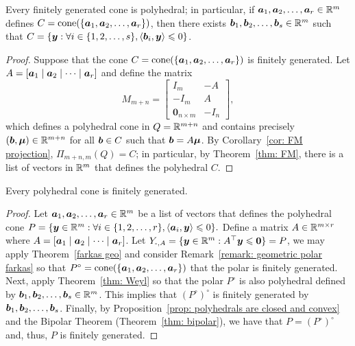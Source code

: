\begin{theorem}\label{thm: Weyl}
Every finitely generated cone is polyhedral; in particular, if ${\boldsymbol a}_1, {\boldsymbol a}_2, \dots, {\boldsymbol a}_r\in\mathbb R^m$ defines $C = \operatorname{cone}(\{{\boldsymbol a}_1, {\boldsymbol a}_2, \dots, {\boldsymbol a}_r\})$, then there exists ${\boldsymbol b}_1, {\boldsymbol b}_2, \dots, {\boldsymbol b}_{s}\in\mathbb R^m$ such that $C = \{{\boldsymbol y}: \forall i\in\{1,2,\dots, s\}, \left\langle{\boldsymbol b}_i, {\boldsymbol y}\right\rangle\leqslant 0\}$. 
\end{theorem}
\begin{proof}
Suppose that the cone $C = \operatorname{cone}(\{{\boldsymbol a}_1, {\boldsymbol a}_2, \dots, {\boldsymbol a}_r\})$ is finitely generated. Let $A = [{\boldsymbol a}_1 \mid {\boldsymbol a}_2 \mid \dots \mid {\boldsymbol a}_r]$ and define the matrix \[ M_{m+n} =  \begin{bmatrix} I_m& -A\\ -I_m & A \\ \bm0_{n\times m} & -I_n \end{bmatrix}, \]
which defines a polyhedral cone in $ Q = \mathbb R^{m+n}$ and contains precisely $({\boldsymbol b}, {\boldsymbol\mu})\in\mathbb R^{m+n}$ for all ${\boldsymbol b}\in C$ such that ${\boldsymbol b} = A{\boldsymbol\mu}$. By Corollary~\ref{cor: FM projection}, $\Pi_{m+n, m}(Q) = C$; in particular, by Theorem~\ref{thm: FM}, there is a list of vectors in $\mathbb R^m$ that defines the polyhedral $C$. 
\end{proof}


\begin{theorem}\label{thm: Minkowski}
Every polyhedral cone is finitely generated. 
\end{theorem}
\begin{proof}
Let ${\boldsymbol a}_1, {\boldsymbol a}_2, \dots, {\boldsymbol a}_r\in\mathbb R^{m}$ be a list of vectors that defines the polyhedral cone $P = \{{\boldsymbol y}\in\mathbb R^m: \forall i\in\{1, 2, \dots, r\}, \left\langle{\boldsymbol a}_i, {\boldsymbol y}\right\rangle \leqslant 0 \}. $ 
Define a matrix $A\in\mathbb R^{m\times r}$ where $A = [{\boldsymbol a}_1 \mid {\boldsymbol a}_2 \mid \dots \mid {\boldsymbol a}_r]$. 
Let $Y_{\text{-}, A} = \{{\boldsymbol y}\in\mathbb R^m: A^\top{\boldsymbol y}\leqslant \boldsymbol0\} = P$, we may apply Theorem~\ref{farkas geo} and consider Remark~\ref{remark: geometric polar farkas} so that $P^\circ = \operatorname{cone}(\{{\boldsymbol a}_1, {\boldsymbol a}_2, \dots, {\boldsymbol a}_r\})$ that the polar is finitely generated. Next, apply Theorem~\ref{thm: Weyl} so that the polar $P^\circ$ is also polyhedral defined by ${\boldsymbol b}_1, {\boldsymbol b}_2, \dots, {\boldsymbol b}_s\in\mathbb R^m$. This implies that $(P^{\circ})^\circ$ is finitely generated by ${\boldsymbol b}_1, {\boldsymbol b}_2, \dots, {\boldsymbol b}_s$. Finally, by Proposition~\ref{prop: polyhedrals are closed and convex} and the Bipolar Theorem (Theorem~\ref{thm: bipolar}), we have that $P = (P^{\circ})^\circ$ and, thus, $P$ is finitely generated. 
\end{proof}

